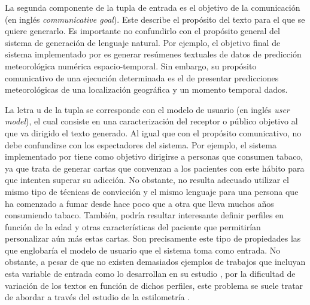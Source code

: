 La segunda componente de la tupla de entrada es el objetivo de la comunicación (en inglés \textit{communicative goal}). Este describe el propósito del texto para el que se quiere generarlo. Es importante no confundirlo con el propósito general del sistema de generación de lenguaje natural. Por ejemplo, el objetivo final de sistema implementado por \cite{turner2007selecting} es generar resúmenes textuales de datos de predicción meteorológica numérica espacio-temporal. Sin embargo, su propósito comunicativo de una ejecución determinada es el de presentar predicciones meteorológicas de una localización geográfica y un momento temporal dados.

La letra u de la tupla se corresponde con el modelo de usuario (en inglés \textit{user model}), el cual consiste en una caracterización del receptor o público objetivo al que va dirigido el texto generado. Al igual que con el propósito comunicativo, no debe confundirse con los espectadores del sistema. Por ejemplo, el sistema implementado por \cite{reiter1999types} tiene como objetivo dirigirse a personas que consumen tabaco, ya que trata de generar cartas que convenzan a los pacientes con este hábito para que intenten superar su adicción. No obstante, no resulta adecuado utilizar el mismo tipo de técnicas de convicción y el mismo lenguaje para una persona que ha comenzado a fumar desde hace poco que a otra que lleva muchos años consumiendo tabaco. También, podría resultar interesante definir perfiles en función de la edad y otras características del paciente que permitirían personalizar aún más estas cartas. Son precisamente este tipo de propiedades las que englobaría el modelo de usuario que el sistema toma como entrada. No obstante, a pesar de que no existen demasiados ejemplos de trabajos que incluyan esta variable de entrada como lo desarrollan en su estudio \cite{goldberg1994fog}, por la dificultad de variación de los textos en función de dichos perfiles, este problema se suele tratar de abordar a través del estudio de la estilometría \citep{mitfg}.

